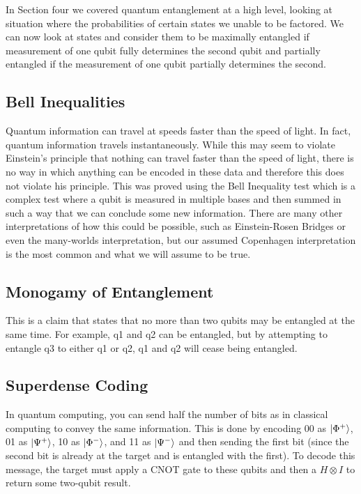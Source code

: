 \documentclass{article}
\begin{document}
In Section four we covered quantum entanglement at a high level, looking at situation where the probabilities of certain states we unable to be factored. We can now look at states and consider them to be maximally entangled if measurement of one qubit fully determines the second qubit and partially entangled if the measurement of one qubit partially determines the second.

\subsection{Bell Inequalities}

Quantum information can travel at speeds faster than the speed of light. In fact, quantum information travels instantaneously. While this may seem to violate Einstein's principle that nothing can travel faster than the speed of light, there is no way in which anything can be encoded in these data and therefore this does not violate his principle. This was proved using the Bell Inequality test which is a complex test where a qubit is measured in multiple bases and then summed in such a way that we can conclude some new information. There are many other interpretations of how this could be possible, such as Einstein-Rosen Bridges or even the many-worlds interpretation, but our assumed Copenhagen interpretation is the most common and what we will assume to be true. 

\subsection{Monogamy of Entanglement}

This is a claim that states that no more than two qubits may be entangled at the same time. For example, q1 and q2 can be entangled, but by attempting to entangle q3 to either q1 or q2, q1 and q2 will cease being entangled. 

\subsection{Superdense Coding}

In quantum computing, you can send half the number of bits as in classical computing to convey the same information. This is done by encoding 00 as $\ket{\Phi^+}$, 01 as $\ket{\Psi^+}$, 10 as $\ket{\Phi^-}$, and 11 as $\ket{\Psi^-}$ and then sending the first bit (since the second bit is already at the target and is entangled with the first). To decode this message, the target must apply a CNOT gate to these qubits and then a $H\otimes I $ to return some two-qubit result. 
\end{document}
